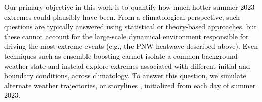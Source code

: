 \documentclass[draft]{agujournal2019}
\renewcommand{\st}[1]{\unskip}
\newcommand{\newTxt}{\textcolor{black}}
\begin{document}
\newTxt{Our primary objective in this work is to quantify how much hotter summer 2023 extremes could plausibly have been. 
From a climatological perspective, such questions are typically answered using statistical \citep{Risser2025data} or theory-based \citep{zhang2023upper,risser2025upper} approaches, but these cannot account for the large-scale dynamical environment responsible for driving the most extreme events (e.g., the PNW heatwave described above). Even techniques such as ensemble boosting \citep{Fischer_2023} cannot isolate a common background weather state and instead explore extremes associated with different initial and boundary conditions, across climatology. To answer this question, we simulate alternate weather trajectories, or storylines \citep{Shepherd2018}, initialized from each day of summer 2023. }


\end{document}
